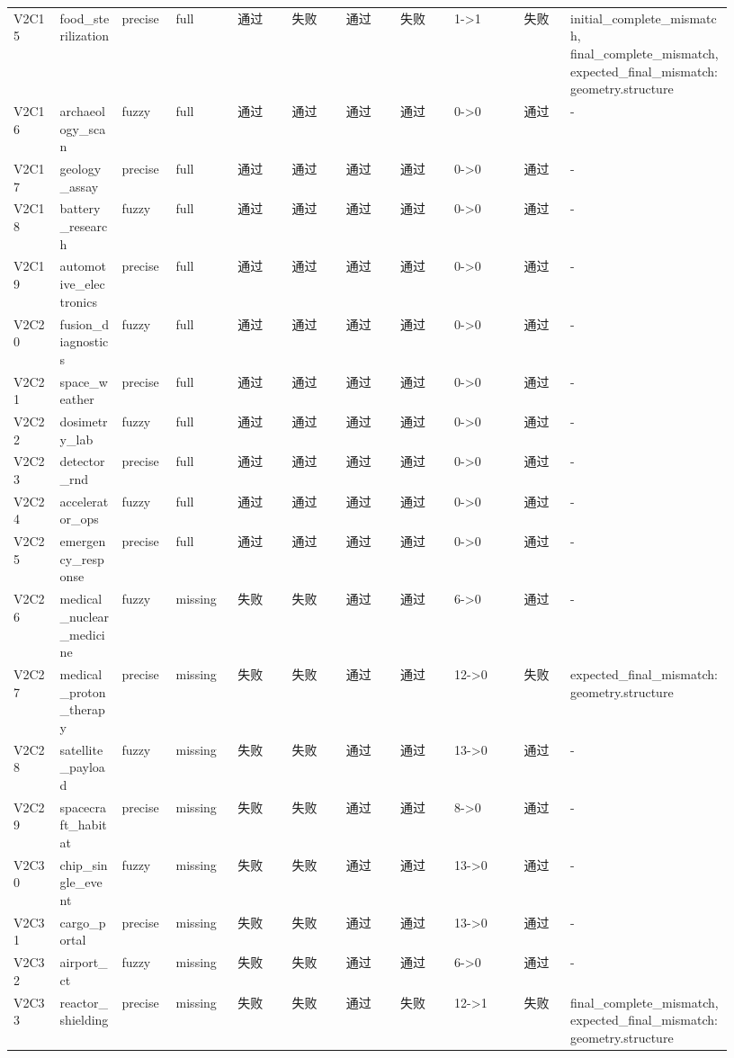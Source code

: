 \documentclass[11pt]{ctexart}
\begin{document}
\begin{longtable}{p{0.06\linewidth}p{0.08\linewidth}p{0.07\linewidth}p{0.08\linewidth}p{0.07\linewidth}p{0.07\linewidth}p{0.07\linewidth}p{0.07\linewidth}p{0.09\linewidth}p{0.06\linewidth}p{0.21\linewidth}}
V2C15 & food\_sterilization & precise & full & 通过 & 失败 & 通过 & 失败 & 1->1 & 失败 & initial\_complete\_mismatch, final\_complete\_mismatch, expected\_final\_mismatch:geometry.structure \\
V2C16 & archaeology\_scan & fuzzy & full & 通过 & 通过 & 通过 & 通过 & 0->0 & 通过 & - \\
V2C17 & geology\_assay & precise & full & 通过 & 通过 & 通过 & 通过 & 0->0 & 通过 & - \\
V2C18 & battery\_research & fuzzy & full & 通过 & 通过 & 通过 & 通过 & 0->0 & 通过 & - \\
V2C19 & automotive\_electronics & precise & full & 通过 & 通过 & 通过 & 通过 & 0->0 & 通过 & - \\
V2C20 & fusion\_diagnostics & fuzzy & full & 通过 & 通过 & 通过 & 通过 & 0->0 & 通过 & - \\
V2C21 & space\_weather & precise & full & 通过 & 通过 & 通过 & 通过 & 0->0 & 通过 & - \\
V2C22 & dosimetry\_lab & fuzzy & full & 通过 & 通过 & 通过 & 通过 & 0->0 & 通过 & - \\
V2C23 & detector\_rnd & precise & full & 通过 & 通过 & 通过 & 通过 & 0->0 & 通过 & - \\
V2C24 & accelerator\_ops & fuzzy & full & 通过 & 通过 & 通过 & 通过 & 0->0 & 通过 & - \\
V2C25 & emergency\_response & precise & full & 通过 & 通过 & 通过 & 通过 & 0->0 & 通过 & - \\
V2C26 & medical\_nuclear\_medicine & fuzzy & missing & 失败 & 失败 & 通过 & 通过 & 6->0 & 通过 & - \\
V2C27 & medical\_proton\_therapy & precise & missing & 失败 & 失败 & 通过 & 通过 & 12->0 & 失败 & expected\_final\_mismatch:geometry.structure \\
V2C28 & satellite\_payload & fuzzy & missing & 失败 & 失败 & 通过 & 通过 & 13->0 & 通过 & - \\
V2C29 & spacecraft\_habitat & precise & missing & 失败 & 失败 & 通过 & 通过 & 8->0 & 通过 & - \\
V2C30 & chip\_single\_event & fuzzy & missing & 失败 & 失败 & 通过 & 通过 & 13->0 & 通过 & - \\
V2C31 & cargo\_portal & precise & missing & 失败 & 失败 & 通过 & 通过 & 13->0 & 通过 & - \\
V2C32 & airport\_ct & fuzzy & missing & 失败 & 失败 & 通过 & 通过 & 6->0 & 通过 & - \\
V2C33 & reactor\_shielding & precise & missing & 失败 & 失败 & 通过 & 失败 & 12->1 & 失败 & final\_complete\_mismatch, expected\_final\_mismatch:geometry.structure \\

\end{longtable}
\end{document}
